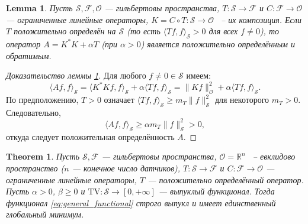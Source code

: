 \documentclass[sn-mathphys-num]{bst/sn-jnl}
\theoremstyle{thmstylethree}
\theoremstyle{thmstyletwo}
\theoremstyle{thmstyleone}
\newtheorem{theorem}{Theorem}
\newtheorem{lemma}{Lemma}
\begin{document}
\begin{lemma}\label{lem:operator_structure}
Пусть $\mathcal{S},\mathcal{F},\mathcal{O}$ — гильбертовы пространства, $T:\mathcal{S}\to\mathcal{F}$
 и $C:\mathcal{F}\to\mathcal{O}$ — ограниченные линейные операторы, $K=C\circ T:\mathcal{S}\to\mathcal{O}$
~-- их композиция. Если $T$ положительно определён на $\mathcal{S}$ 
(то есть $\langle Tf, f\rangle_{\mathcal{S}} > 0$ для всех $f \neq 0$), 
то оператор $A=K^*K+\alpha T$ (при $\alpha>0$) является положительно определённым и обратимым.
\end{lemma}

\begin{proof}[Доказательство леммы \ref{lem:operator_structure}]
Для любого $f \neq 0 \in \mathcal{S}$ имеем:
\begin{equation}
    \langle Af, f\rangle_{\mathcal{S}} = \langle K^*Kf, f\rangle_{\mathcal{S}} + 
    \alpha \langle Tf, f\rangle_{\mathcal{S}} = \|Kf\|_{\mathcal{O}}^2 + \alpha \langle Tf, f\rangle_{\mathcal{S}}.
\end{equation}
По предположению, $T>0$ означает $\langle Tf, f\rangle_{\mathcal{S}} \geq m_T \|f\|_{\mathcal{S}}^2$ для некоторого $m_T > 0$. Следовательно,
\begin{equation}
    \langle Af, f\rangle_{\mathcal{S}} \geq \alpha m_T \|f\|_{\mathcal{S}}^2 > 0,
\end{equation}
откуда следует положительная определённость $A$.
\end{proof}

\begin{theorem}\label{th:general_uniqueness}
Пусть $\mathcal{S},\mathcal{F}$ — гильбертовы пространства, $\mathcal{O} = \mathbb{R}^n$ ~-- 
евклидово пространство ($n$ — конечное число датчиков), $T:\mathcal{S}\to\mathcal{F}$ и 
$C:\mathcal{F}\to\mathcal{O}$ — ограниченные линейные операторы, 
$T$ — положительно определённый оператор. 
Пусть $\alpha>0$, $\beta\ge0$ и $\mathrm{TV}:\mathcal{S}\to[0,+\infty]$ — выпуклый
функционал. Тогда функционал \eqref{eq:general_functional} строго выпукл и имеет единственный 
глобальный минимум.
\end{theorem}
\end{document}
